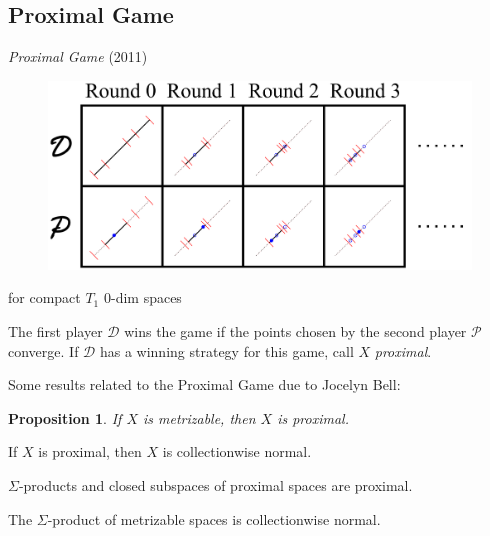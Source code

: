 \documentclass{beamer}
\newtheorem{proposition}[theorem]{Proposition}
\theoremstyle{definition}
\newcommand{\<}{\langle}
\renewcommand{\>}{\rangle}
\newcommand{\pl}[1]{\mathscr{#1}}
\newcommand{\term}{\textit}
\begin{document}




\subsection{Proximal Game}

\begin{frame}
  \term{Proximal Game} (2011)
  \cite{MR3239205}

  \vspacing

  \begin{figure}
    \includegraphics[width=0.8\linewidth]{proximalGame.pdf}
  \end{figure}
  {\tiny for compact $T_1$ $0$-dim spaces}

  \vpause

  The first player $\pl D$ wins the game if the points chosen by the
  second player $\pl P$ converge. If $\pl D$ has a winning
  strategy for this game, call $X$ \term{proximal}.
\end{frame}

\begin{frame}
  Some results related to the Proximal Game due to Jocelyn Bell:

  \begin{proposition}
    If $X$ is metrizable, then $X$ is proximal.
  \end{proposition}

  \begin{theorem}
    If $X$ is proximal, then $X$ is collectionwise normal.
  \end{theorem}

  \begin{theorem}
    $\Sigma$-products and closed subspaces of proximal spaces are proximal.
  \end{theorem}

  \pause

  \begin{corollary}
    The $\Sigma$-product of metrizable spaces is collectionwise normal.
    \cite{MR0461410} \cite{MR716576}
  \end{corollary}
\end{frame}
\end{document}
